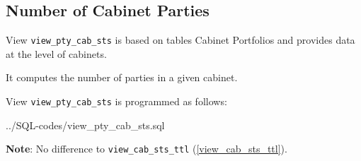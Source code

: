 \subsection{Number of Cabinet Parties}\label{view_pty_cab_sts}
View \texttt{\footnotesize view\_pty\_cab\_sts} is based on tables Cabinet Portfolios and provides data at the level of cabinets.

It computes the number of parties in a given cabinet.

View \texttt{\footnotesize view\_pty\_cab\_sts} is programmed as follows:

%
{../SQL-codes/view_pty_cab_sts.sql}
	
{\bf Note}: No difference to \texttt{\footnotesize view\_cab\_sts\_ttl} (\ref{view_cab_sts_ttl}).